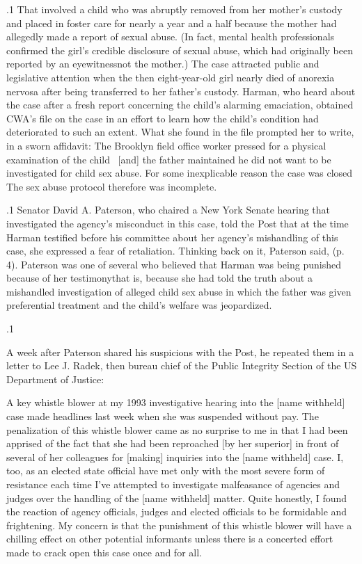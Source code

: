 \documentclass[11pt, twoside]{article}
\begin{document}
{\p.1{%
That  involved a child who was abruptly removed from her mother's custody and placed in foster care for nearly a
year and a half because the mother had allegedly made a  report
of sexual abuse. (In fact, mental health professionals confirmed the girl's
credible disclosure of sexual abuse, which had originally been reported
by an eyewitness\mdash{}not the mother.) The case attracted public and legislative attention when the then eight-year-old girl nearly died of anorexia
nervosa after being transferred to her father's custody. Harman, who
heard about the case after a fresh report concerning the child's alarming
emaciation, obtained CWA's file on the case in an effort to learn how the
child's condition had deteriorated to such an extent. What she found in
the file prompted her to write, in a sworn affidavit:
The Brooklyn field office worker pressed for a physical examination of the child \ellThree{2pt}{2pt}\ [and] the father maintained he did not want
to be investigated for child sex abuse. For some inexplicable reason the case was closed\ellFour{2pt}{2pt} The sex abuse protocol therefore was
incomplete.
}%

\p.1{%
Senator David A. Paterson, who chaired a New York Senate hearing
that investigated the agency's misconduct in this case, told the Post that
at the time Harman testified before his committee about her agency's
mishandling of this case, she expressed a fear of retaliation. Thinking
back on it, Paterson said,  (p. 4). Paterson was one of several who
believed that Harman was being punished because of her
testimony\mdash{}that is, because she had told the truth about a mishandled investigation of alleged child sex abuse in which the father was given preferential
treatment and the child's welfare was jeopardized.
}%

\p.1{%
A week after Paterson shared his suspicions with the Post, he repeated
them in a letter to Lee J. Radek, then bureau chief of the Public Integrity
Section of the US Department of Justice:

\begin{blockQuote}
A key whistle blower at my 1993 investigative hearing into the
[name withheld] case made headlines last week when she was suspended without pay. The penalization of this whistle blower came
as no surprise to me in that I had been apprised of the fact that she
had been reproached [by her superior] in front of several of her colleagues for [making] inquiries into the [name withheld] case. I, too,
as an elected state official have met only with the most severe form
of resistance each time I've attempted to investigate malfeasance of
agencies and judges over the handling of the [name withheld] matter. Quite honestly, I found the reaction of agency officials, judges
and elected officials to be formidable and frightening. My concern
is that the punishment of this whistle blower will have a chilling
effect on other potential informants unless there is a concerted
effort made to crack open this case once and for all.
\end{blockQuote}

}}
\end{document}
